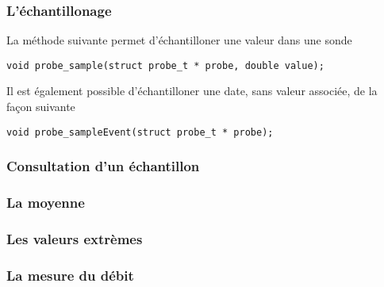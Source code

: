 %
\subsubsection{L'échantillonage}

   La méthode suivante permet d'échantilloner une valeur dans une
sonde 

\begin{verbatim}
void probe_sample(struct probe_t * probe, double value);
\end{verbatim}

   Il est également possible d'échantilloner une date, sans valeur
associée, de la façon suivante 

\begin{verbatim}
void probe_sampleEvent(struct probe_t * probe);
\end{verbatim}

%
\subsubsection{Consultation d'un échantillon}

%
\subsubsection{La moyenne}

%
\subsubsection{Les valeurs extrèmes}

%
\subsubsection{La mesure du débit}

